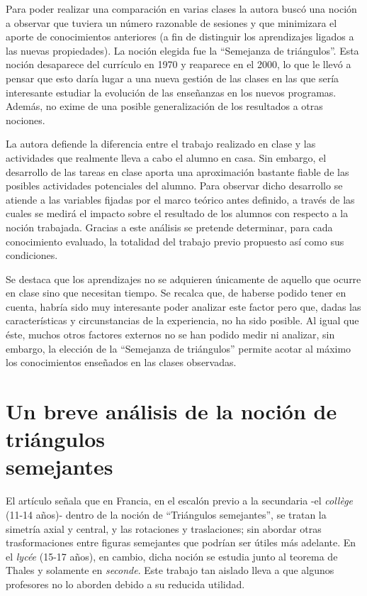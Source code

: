 	Para poder realizar una comparación en varias clases la autora buscó una noción a observar que tuviera un número razonable de sesiones y que minimizara el aporte de conocimientos anteriores (a fin de distinguir los aprendizajes ligados a las nuevas propiedades). La noción elegida fue la ``Semejanza de triángulos''. Esta noción desaparece del currículo en 1970 y reaparece en el 2000, %
	lo que le llevó a pensar que esto daría lugar a una nueva gestión de las clases en las que sería interesante estudiar la evolución de las enseñanzas en los nuevos programas. Además, no exime de una posible generalización de los resultados a otras nociones.
	
	La autora defiende la diferencia entre el trabajo realizado en clase y las actividades que realmente lleva a cabo el alumno en casa. Sin embargo, el desarrollo de las tareas en clase aporta una aproximación bastante fiable de las posibles actividades potenciales del alumno. Para observar dicho desarrollo se atiende a las variables fijadas por el marco teórico antes definido, a través de las cuales se medirá el impacto sobre el resultado de los alumnos con respecto a la noción trabajada. Gracias a este análisis se pretende determinar, para cada conocimiento evaluado, la totalidad del trabajo previo propuesto así como sus condiciones.
	
	Se destaca que los aprendizajes no se adquieren únicamente de aquello que ocurre en clase sino que necesitan tiempo. Se recalca que, de haberse podido tener en cuenta, habría sido muy interesante poder analizar este factor pero que, dadas las características y circunstancias de la experiencia, no ha sido posible. Al igual que éste, muchos otros factores externos no se han podido medir ni analizar, sin embargo, la elección de la ``Semejanza de triángulos'' permite acotar al máximo los conocimientos enseñados en las clases observadas.
	

\section*{Un breve análisis de la noción de triángulos\\ semejantes}
	El artículo señala que en Francia, en el escalón previo a la secundaria -el \textit{collège} (11-14 años)- dentro de la noción de ``Triángulos semejantes'', se tratan la simetría axial y central, y las rotaciones y  traslaciones; sin abordar otras trasformaciones entre figuras semejantes que podrían ser útiles más adelante. En el \textit{lycée} (15-17 años), en cambio, dicha noción se estudia junto al teorema de Thales y solamente en \textit{seconde}. Este trabajo tan aislado lleva a que algunos profesores no lo aborden debido a su reducida utilidad.
	
